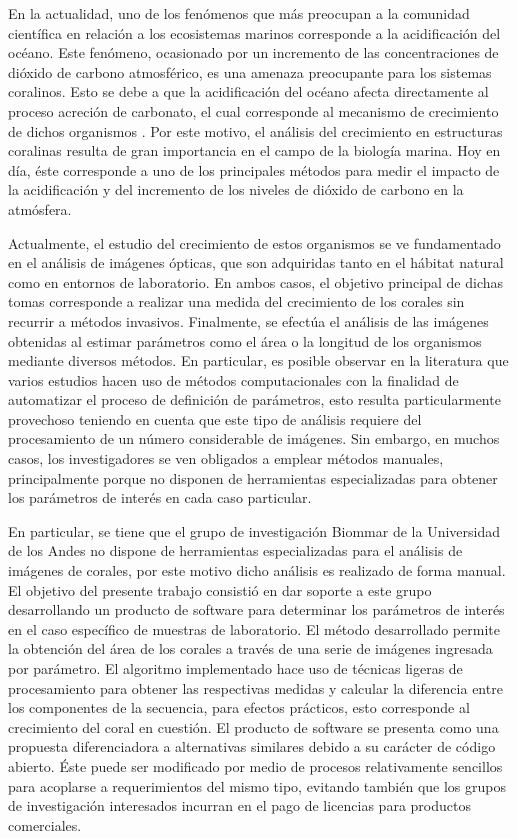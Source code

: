 \documentclass[journal]{IEEEtran}
\begin{document}
\begin{par}
En la actualidad, uno de los fenómenos que más preocupan a la comunidad científica en relación a los ecosistemas marinos corresponde a la acidificación del océano. Este fenómeno, ocasionado por un incremento de las concentraciones de dióxido de carbono atmosférico, es una amenaza preocupante para los sistemas coralinos. Esto se debe a que la acidificación del océano afecta directamente al proceso acreción de carbonato, el cual corresponde al mecanismo de crecimiento de dichos organismos \cite{acidificacion}. Por este motivo, el análisis del crecimiento en estructuras coralinas resulta de gran importancia en el campo de la biología marina. Hoy en día, éste corresponde a uno de los principales métodos para medir el impacto de la acidificación y del incremento de los niveles de dióxido de carbono en la atmósfera.
\end{par}
\begin{par}
Actualmente, el estudio del crecimiento de estos organismos se ve fundamentado en el análisis de imágenes ópticas, que son adquiridas tanto en el hábitat natural como en entornos de laboratorio. En ambos casos, el objetivo principal de dichas tomas corresponde a realizar una medida del crecimiento de los corales sin recurrir a métodos invasivos. Finalmente, se efectúa el análisis de las imágenes obtenidas al estimar parámetros como el área o la longitud de los organismos mediante diversos métodos. En particular, es posible observar en la literatura que varios estudios hacen uso de métodos computacionales con la finalidad de automatizar el proceso de definición de parámetros, esto resulta particularmente provechoso teniendo en cuenta que este tipo de análisis requiere del procesamiento de un número considerable de imágenes. Sin embargo, en muchos casos, los investigadores se ven obligados a emplear métodos manuales, principalmente porque no disponen de herramientas especializadas para obtener los parámetros de interés en cada caso particular.
\end{par}
\begin{par}
En particular, se tiene que el grupo de investigación Biommar de la Universidad de los Andes no dispone de herramientas especializadas para el análisis de imágenes de corales, por este motivo dicho análisis es realizado de forma manual. El objetivo del presente trabajo consistió en dar soporte a este grupo desarrollando un producto de software para determinar los parámetros de interés en el caso específico de muestras de laboratorio. El método desarrollado permite la obtención del área de los corales a través de una serie de imágenes ingresada por parámetro. El algoritmo implementado hace uso de técnicas ligeras de procesamiento para obtener las respectivas medidas y calcular la diferencia entre los componentes de la secuencia, para efectos prácticos, esto corresponde al crecimiento del coral en cuestión. El producto de software se presenta como una propuesta diferenciadora a alternativas similares debido a su carácter de código abierto. Éste puede ser modificado por medio de procesos relativamente sencillos para acoplarse a requerimientos del mismo tipo, evitando también que los grupos de investigación interesados incurran en el pago de licencias para productos comerciales.
\end{par}
\end{document}
